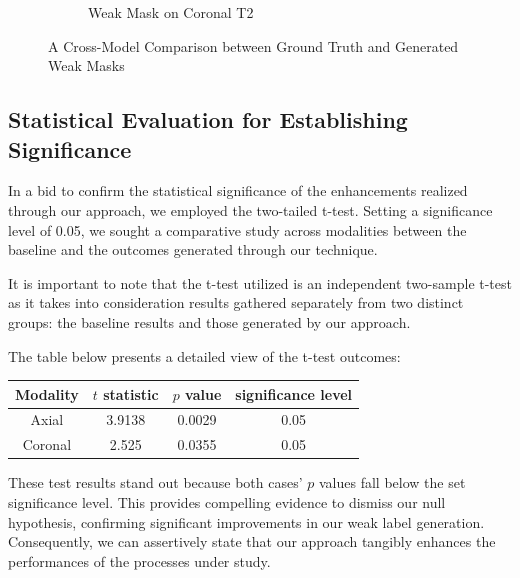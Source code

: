 \begin{figure}[htp]
\begin{subfigure}[b]{0.48\textwidth}
        \caption{Weak Mask on Coronal T2}
        \label{fig:mask-coronal}
    \end{subfigure}
       \caption{A Cross-Model Comparison between Ground Truth and Generated Weak Masks}
       \label{fig:comparison-mask-gt}
\end{figure}
\subsection{Statistical Evaluation for Establishing Significance}

In a bid to confirm the statistical significance of the enhancements realized through our approach, we employed the two-tailed t-test. Setting a significance level of 0.05, we sought a comparative study across modalities between the baseline and the outcomes generated through our technique.

It is important to note that the t-test utilized is an independent two-sample t-test as it takes into consideration results gathered separately from two distinct groups: the baseline results and those generated by our approach.

The table below presents a detailed view of the t-test outcomes:

\begin{table}[ht]
\centering
\begin{tabular}{c|c|c|c}
Modality & \(t\) statistic & \(p\) value & significance level \\
\hline
Axial & 3.9138 & 0.0029 & 0.05 \\
\hline
Coronal & 2.525 & 0.0355 & 0.05
\end{tabular}
\end{table}

These test results stand out because both cases' \(p\) values fall below the set significance level. This provides compelling evidence to dismiss our null hypothesis, confirming significant improvements in our weak label generation. Consequently, we can assertively state that our approach tangibly enhances the performances of the processes under study.

